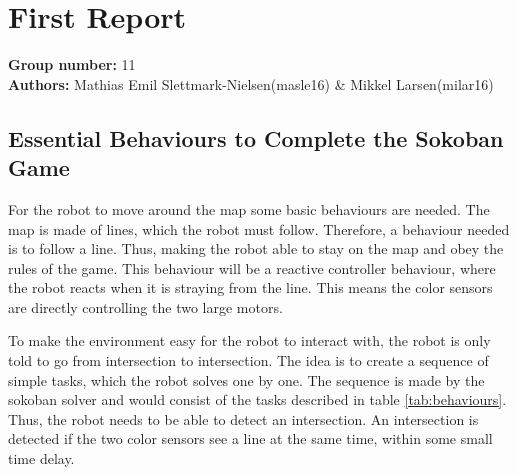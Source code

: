 \documentclass[../report.tex]{subfiles}
\begin{document}
\section*{\centering First Report}

\textbf{Group number:} 11 \\
\textbf{Authors:} Mathias Emil Slettmark-Nielsen(masle16) \& Mikkel Larsen(milar16)

\subsection*{Essential Behaviours to Complete the Sokoban Game}

For the robot to move around the map some basic behaviours are needed. The map is made of lines, which the robot must follow. Therefore, a behaviour needed is to follow a line. Thus, making the robot able to stay on the map and obey the rules of the game. This behaviour will be a reactive controller behaviour, where the robot reacts when it is straying from the line. This means the color sensors are directly controlling the two large motors. 

To make the environment easy for the robot to interact with, the robot is only told to go from intersection to intersection. The idea is to create a sequence of simple tasks, which the robot solves one by one. The sequence is made by the sokoban solver and would consist of the tasks described in table \ref{tab:behaviours}. Thus, the robot needs to be able to detect an intersection. An intersection is detected if the two color sensors see a line at the same time, within some small time delay. 
\end{document}
